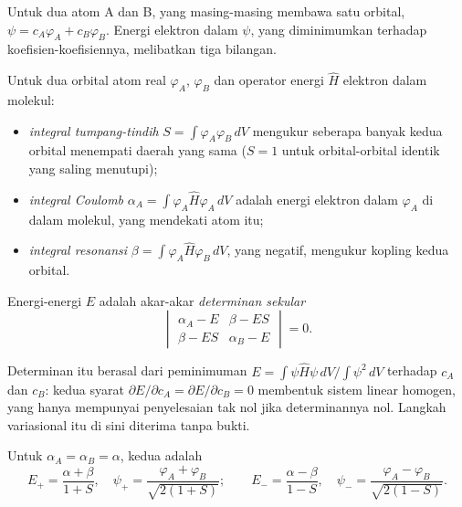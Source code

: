 Untuk dua atom A dan B, yang masing-masing membawa satu orbital,
$\psi = c_A\varphi_A + c_B\varphi_B$. Energi elektron dalam $\psi$, yang
diminimumkan terhadap koefisien-koefisiennya, melibatkan tiga bilangan.

\begin{definition}\label{def:b2:diatomic-mos:integrals}
Untuk dua orbital atom real $\varphi_A$, $\varphi_B$ dan operator energi $\hat H$
elektron dalam molekul:
\begin{itemize}
  \item \emph{integral tumpang-tindih}
        $S = \int\varphi_A\varphi_B\,dV$ mengukur seberapa banyak kedua
        orbital menempati daerah yang sama ($S = 1$ untuk orbital-orbital
        identik yang saling menutupi);
  \item \emph{integral Coulomb} $\alpha_A = \int\varphi_A\hat
        H\varphi_A\,dV$ adalah energi elektron dalam $\varphi_A$ di dalam
        molekul, yang mendekati  atom itu;
  \item \emph{integral resonansi} $\beta = \int\varphi_A\hat
        H\varphi_B\,dV$, yang negatif, mengukur kopling kedua orbital.
\end{itemize}
Energi-energi $E$  adalah akar-akar \emph{determinan
sekular}
\[
  \begin{vmatrix} \alpha_A - E & \beta - ES \\ \beta - ES & \alpha_B - E \end{vmatrix} = 0 .
\]
\end{definition}

Determinan itu berasal dari peminimuman
$E = \int\psi\hat H\psi\,dV/\int\psi^2\,dV$ terhadap $c_A$ dan $c_B$: kedua
syarat $\partial E/\partial c_A =
\partial E/\partial c_B = 0$ membentuk
sistem linear homogen, yang hanya mempunyai penyelesaian tak nol jika
determinannya nol. Langkah variasional itu di sini diterima tanpa bukti.

\begin{theorem}\label{thm:b2:diatomic-mos:homonuclear}
Untuk $\alpha_A = \alpha_B = \alpha$, kedua  adalah
\[
  E_+ = \frac{\alpha + \beta}{1 + S}, \quad \psi_+ = \frac{\varphi_A + \varphi_B}{\sqrt{2(1 + S)}} ;
  \qquad
  E_- = \frac{\alpha - \beta}{1 - S}, \quad \psi_- = \frac{\varphi_A - \varphi_B}{\sqrt{2(1 - S)}} .
\]
\end{theorem}

